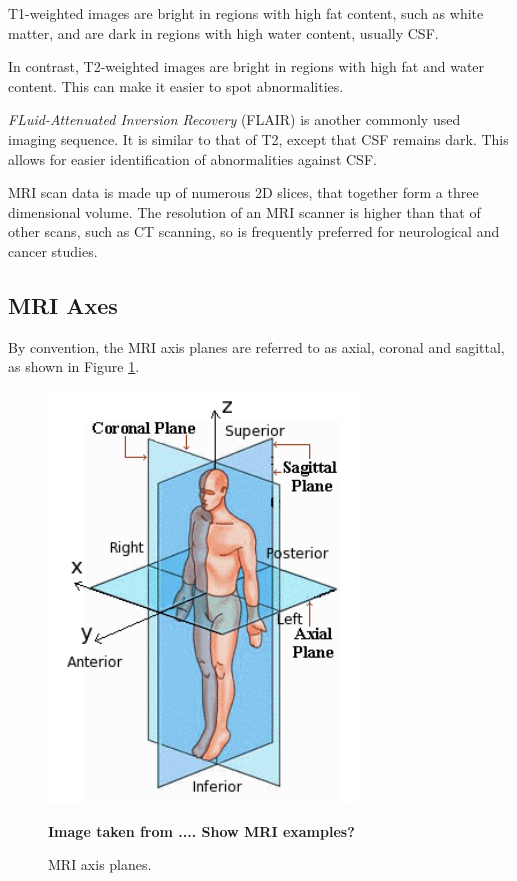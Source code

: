 T1-weighted images are bright in regions with high fat content, such as white matter, and are dark in regions with high water content, usually CSF.

In contrast, T2-weighted images are bright in regions with high fat and water content. This can make it easier to spot abnormalities.

\textit{FLuid-Attenuated Inversion Recovery} (FLAIR) is another commonly used imaging sequence. It is similar to that of T2, except that CSF remains dark. This allows for easier identification of abnormalities against CSF.


MRI scan data is made up of numerous 2D slices, that together form a three dimensional volume. The resolution of an MRI scanner is higher than that of other scans, such as CT scanning, so is frequently preferred for neurological and cancer studies.

\subsection*{MRI Axes}

By convention, the MRI axis planes are referred to as axial, coronal and sagittal, as shown in Figure \ref{svd-axes}.

\begin{figure}[ht]
	\centering
	\includegraphics[scale=0.8]{Images/2_axes.png}
	\caption{MRI axis planes.}
	\small \textbf{Image taken from .... Show MRI examples?}
	\label{svd-axes}
\end{figure}

